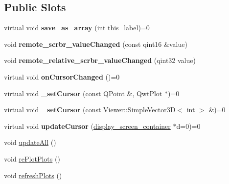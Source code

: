 \subsection*{Public Slots}
\begin{DoxyCompactItemize}
\item 
\mbox{\label{classScreen__manager_a4a067888de043f5a73a56bc7f6eef4f6}} 
virtual void {\bfseries save\+\_\+as\+\_\+array} (int this\+\_\+label)=0
\item 
\mbox{\label{classScreen__manager_ac91e8b023e12dc15f8c6ab1951b4ce70}} 
void {\bfseries remote\+\_\+scrbr\+\_\+value\+Changed} (const qint16 \&value)
\item 
\mbox{\label{classScreen__manager_acfda6fcca2edd2d2a155b000256dad56}} 
void {\bfseries remote\+\_\+relative\+\_\+scrbr\+\_\+value\+Changed} (qint32 value)
\item 
\mbox{\label{classScreen__manager_a73a3bc131dbc70ce1eb689a890425227}} 
virtual void {\bfseries on\+Cursor\+Changed} ()=0
\item 
\mbox{\label{classScreen__manager_a91d823fd453b3d362ed06d5cf6cbdfb6}} 
virtual void {\bfseries \+\_\+set\+Cursor} (const Q\+Point \&, Qwt\+Plot $\ast$)=0
\item 
\mbox{\label{classScreen__manager_ae4cdc1ca921d3fb581c35d5df4c21d2b}} 
virtual void {\bfseries \+\_\+set\+Cursor} (const \mbox{\hyperlink{classViewer_1_1SimpleVector3D}{Viewer\+::\+Simple\+Vector3D}}$<$ int $>$ \&)=0
\item 
\mbox{\label{classScreen__manager_a246b4fab17012a3b708613db86b7794f}} 
virtual void {\bfseries update\+Cursor} (\mbox{\hyperlink{classdisplay__screen__container}{display\+\_\+screen\+\_\+container}} $\ast$d=0)=0
\item 
void \mbox{\hyperlink{classScreen__manager_afc206ddd1fee12c08d890d7a0c4c5fcb}{update\+All}} ()
\item 
void \mbox{\hyperlink{classScreen__manager_a0a17fba71b72fedefed5651b883ed371}{re\+Plot\+Plots}} ()
\item 
void \mbox{\hyperlink{classScreen__manager_a846061886a15cdc0de881976564b02f2}{refresh\+Plots}} ()
\end{DoxyCompactItemize}
